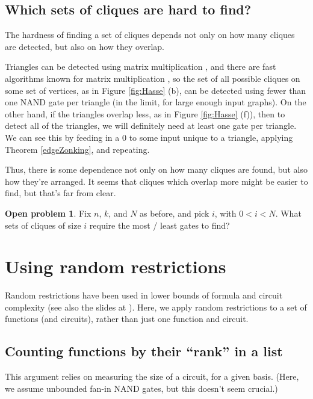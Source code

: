 \documentclass[12pt]{article}
\theoremstyle{definition}
\newtheorem{prob}{Open problem}[section]
\begin{document}
\subsection{Which sets of cliques are hard to find?}
\label{sec:whichCliques}

The hardness of finding a set of cliques
depends not only on how many cliques are detected,
but also on how they overlap.

Triangles can be detected using matrix multiplication \cite{itai_finding_1977},
and there are fast algorithms known for matrix multiplication
\cite{strassen_gaussian_1969}
\cite{williams_multiplying_2012}, so the set of all possible
cliques on some set of vertices, as in
Figure \ref{fig:Hasse} (b),
 can be detected
using fewer than one NAND gate per triangle (in the limit,
for large enough input graphs).
On the other hand, if the triangles overlap less, as in
Figure \ref{fig:Hasse} (f)),
then to detect all of the triangles, we will definitely need at least one
gate per triangle. We can see this by feeding in a 0 to some input
unique to a triangle, applying Theorem \ref{edgeZonking}, and repeating.

Thus, there is some dependence not only on how many cliques are found, but
also how they're arranged. It seems that cliques which overlap more might
be easier to find, but that's far from clear.

\begin{prob}
\label{overlapEffect}
Fix $n$, $k$, and $N$ as before, and pick $i$, with
$0 < i < N$. What sets of cliques of size $i$
require the most / least gates to find?
\end{prob}

\section{Using random restrictions}

Random restrictions have been used in lower bounds of formula
\cite{subbotovskaya1963comparison} and circuit \cite{hastad1987lower}
complexity (see also the slides at \cite{rossmanRestrictions}).
Here, we apply random restrictions to a set of functions (and circuits),
rather than just one function and circuit.

\subsection{Counting functions by their ``rank'' in a list}

This argument relies on measuring the size of a circuit,
for a given basis. (Here, we assume unbounded fan-in
NAND gates, but this doesn't seem crucial.)
\end{document}
